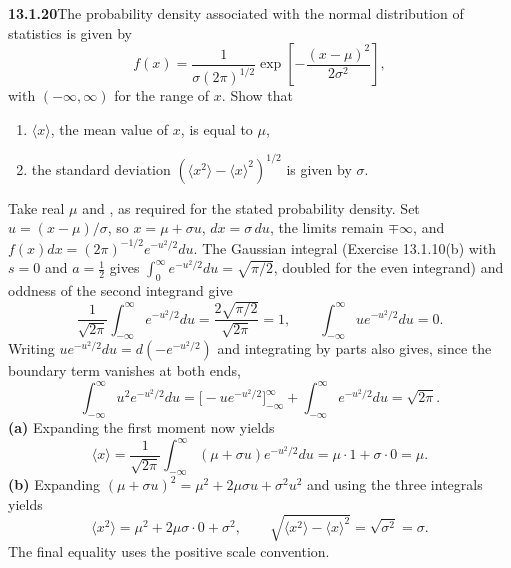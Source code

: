 \par\bigskip
\noindent\textbf{13.1.20}\quad The probability density associated with the
normal distribution of statistics is given by
\[
f(x)=\frac{1}{\sigma(2\pi)^{1/2}}
\exp\left[-\frac{(x-\mu)^{2}}{2\sigma^{2}}\right],
\]
with $(-\infty,\infty)$ for the range of $x$. Show that
\begin{enumerate}
\item[(a)] $\langle x\rangle$, the mean value of $x$, is equal to $\mu$,
\item[(b)] the standard deviation
  $(\langle x^{2}\rangle-\langle x\rangle^{2})^{1/2}$ is given by $\sigma$.
\end{enumerate}
\par\smallskip
{}
\solution
Take real $\mu$ and , as required for the stated
probability density.  Set $u=(x-\mu)/\sigma$, so
$x=\mu+\sigma u$, $dx=\sigma\,du$, the limits remain $\mp\infty$, and
$f(x)dx=(2\pi)^{-1/2}e^{-u^2/2}du$.
The Gaussian integral (Exercise 13.1.10(b) with $s=0$ and
$a=\tfrac12$ gives $\int_0^\infty e^{-u^2/2}du=\sqrt{\pi/2}$, doubled
for the even integrand) and oddness of the second integrand give
\[
\frac1{\sqrt{2\pi}}\int_{-\infty}^{\infty}e^{-u^2/2}du
=\frac{2\sqrt{\pi/2}}{\sqrt{2\pi}}=1,
\qquad
\int_{-\infty}^{\infty}u e^{-u^2/2}du=0.
\]
Writing $ue^{-u^2/2}du=d(-e^{-u^2/2})$ and integrating by parts
also gives, since the boundary term vanishes at both ends,
\[
\int_{-\infty}^{\infty}u^2e^{-u^2/2}du
=\bigl[-u e^{-u^2/2}\bigr]_{-\infty}^{\infty}
+\int_{-\infty}^{\infty}e^{-u^2/2}du=\sqrt{2\pi}.
\]
\textbf{(a)} Expanding the first moment now yields
\[
\langle x\rangle=\frac1{\sqrt{2\pi}}
\int_{-\infty}^{\infty}(\mu+\sigma u)e^{-u^2/2}du
=\mu\cdot1+\sigma\cdot0=\boxed{\mu}.
\]
\textbf{(b)} Expanding $(\mu+\sigma u)^2=\mu^2+2\mu\sigma u+\sigma^2u^2$
and using the three integrals yields
\[
\langle x^2\rangle=\mu^2+2\mu\sigma\cdot0+\sigma^2,
\qquad
\boxed{\sqrt{\langle x^2\rangle-\langle x\rangle^2}
=\sqrt{\sigma^2}=\sigma}.
\]
The final equality uses the positive scale convention.


